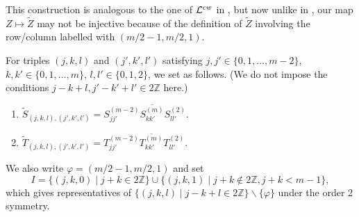 \documentclass[11pt]{article}
\def\phi{\varphi}
\def\setminus{\smallsetminus}
\def\setminus{\smallsetminus}
\def\Z{{\mathbb Z}}
\begin{document}
%
This construction is analogous to the one of ${\cal L}^{cw}$
in \cite[page 178]{GW}, but now
unlike in \cite{GW}, our map $Z\mapsto \tilde Z$ may not be 
injective because of the definition of $\tilde Z$ involving
the row/column labelled with $(m/2-1,m/2,1)$.

For triples $(j,k,l)$ and $(j',k',l')$ satisfying
$j,j'\in \{0,1,\dots,m-2\}$,
$k,k'\in \{0,1,\dots,m\}$,
$l,l'\in \{0,1,2\}$, we set as follows.
(We do not impose the conditions $j-k+l, j'-k'+l'\in 2\Z$ here.)
%
\begin{enumerate}
\item $\tilde S_{(j,k,l),(j',k',l')}=S^{(m-2)}_{jj'}
\overline{S^{(m)}_{kk'}} S^{(2)}_{ll'}$.
\item $\tilde T_{(j,k,l),(j',k',l')}=T^{(m-2)}_{jj'}
\overline{T^{(m)}_{kk'}} T^{(2)}_{ll'}$.
\end{enumerate}
%
We also write $\phi=(m/2-1,m/2,1)$ and set
$$I=\{(j,k,0)\mid j+k\in2\Z\}\cup
\{(j,k,1)\mid j+k\notin2\Z, j+k<m-1\},$$
which gives representatives of
$\{(j,k,l)\mid j-k+l\in2\Z\}\setminus\{\phi\}$ under the
order 2 symmetry.
\end{document}
